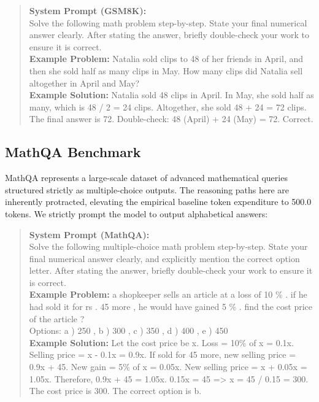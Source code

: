 \documentclass[11pt]{article}
\begin{document}
\begin{quote}
\footnotesize
\textbf{System Prompt (GSM8K):} \\
Solve the following math problem step-by-step. State your final numerical answer clearly. After stating the answer, briefly double-check your work to ensure it is correct. \\
\textbf{Example Problem:} Natalia sold clips to 48 of her friends in April, and then she sold half as many clips in May. How many clips did Natalia sell altogether in April and May? \\
\textbf{Example Solution:} Natalia sold 48 clips in April. In May, she sold half as many, which is 48 / 2 = 24 clips. Altogether, she sold 48 + 24 = 72 clips. The final answer is 72. Double-check: 48 (April) + 24 (May) = 72. Correct.
\normalsize
\end{quote}

\subsection{MathQA Benchmark}
MathQA represents a large-scale dataset of advanced mathematical queries structured strictly as multiple-choice outputs. The reasoning paths here are inherently protracted, elevating the empirical baseline token expenditure to 500.0 tokens. We strictly prompt the model to output alphabetical answers:

\begin{quote}
\footnotesize
\textbf{System Prompt (MathQA):} \\
Solve the following multiple-choice math problem step-by-step. State your final numerical answer clearly, and explicitly mention the correct option letter. After stating the answer, briefly double-check your work to ensure it is correct. \\
\textbf{Example Problem:} a shopkeeper sells an article at a loss of 10 \% . if he had sold it for rs . 45 more , he would have gained 5 \% . find the cost price of the article ? \\
Options: a ) 250 , b ) 300 , c ) 350 , d ) 400 , e ) 450 \\
\textbf{Example Solution:} Let the cost price be x. Loss = 10\% of x = 0.1x. Selling price = x - 0.1x = 0.9x. If sold for 45 more, new selling price = 0.9x + 45. New gain = 5\% of x = 0.05x. New selling price = x + 0.05x = 1.05x. Therefore, 0.9x + 45 = 1.05x. 0.15x = 45 => x = 45 / 0.15 = 300. The cost price is 300. The correct option is b.
\normalsize
\end{quote}
\end{document}
